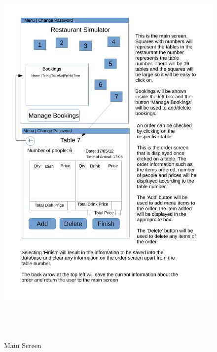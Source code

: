 \begin{figure}[H]
    \includegraphics[height = 20cm]{./Design/Images/Interface2}
    \caption{Main Screen} \label{fig:Main}
\end{figure}


